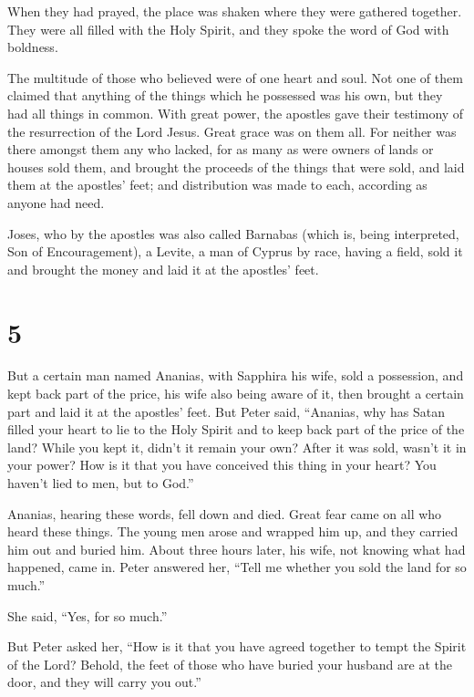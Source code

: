  When they had prayed, the place was shaken where they were
gathered together. They were all filled with the Holy Spirit, and they
spoke the word of God with boldness.

 The multitude of those who believed were of one heart and
soul. Not one of them claimed that anything of the things which he
possessed was his own, but they had all things in common. 
With great power, the apostles gave their testimony of the resurrection
of the Lord Jesus. Great grace was on them all.  For
neither was there amongst them any who lacked, for as many as were
owners of lands or houses sold them, and brought the proceeds of the
things that were sold,  and laid them at the apostles'
feet; and distribution was made to each, according as anyone had need.

 Joses, who by the apostles was also called Barnabas (which
is, being interpreted, Son of Encouragement), a Levite, a man of Cyprus
by race,  having a field, sold it and brought the money and
laid it at the apostles' feet.

\hypertarget{section-4}{%
\section{5}\label{section-4}}

 But a certain man named Ananias, with Sapphira his wife,
sold a possession,  and kept back part of the price, his
wife also being aware of it, then brought a certain part and laid it at
the apostles' feet.  But Peter said, ``Ananias, why has
Satan filled your heart to lie to the Holy Spirit and to keep back part
of the price of the land?  While you kept it, didn't it
remain your own? After it was sold, wasn't it in your power? How is it
that you have conceived this thing in your heart? You haven't lied to
men, but to God.''

 Ananias, hearing these words, fell down and died. Great
fear came on all who heard these things.  The young men
arose and wrapped him up, and they carried him out and buried him.
 About three hours later, his wife, not knowing what had
happened, came in.  Peter answered her, ``Tell me whether
you sold the land for so much.''

She said, ``Yes, for so much.''

 But Peter asked her, ``How is it that you have agreed
together to tempt the Spirit of the Lord? Behold, the feet of those who
have buried your husband are at the door, and they will carry you out.''

